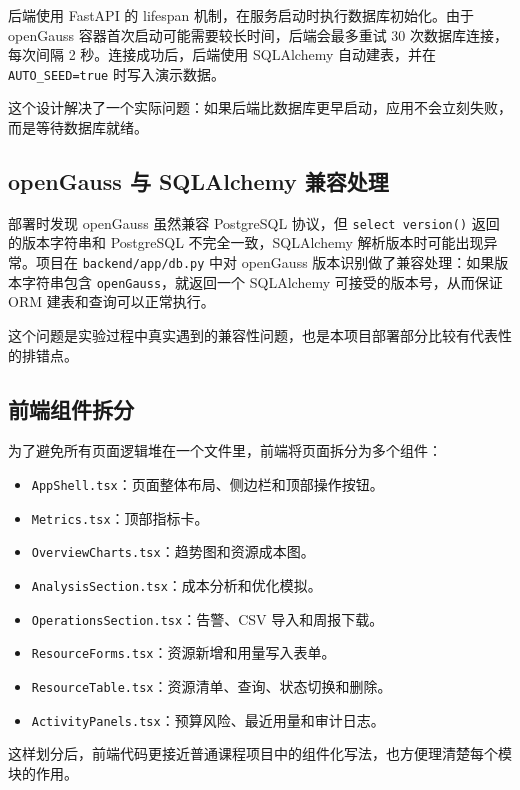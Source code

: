 后端使用 FastAPI 的 lifespan 机制，在服务启动时执行数据库初始化。由于
openGauss 容器首次启动可能需要较长时间，后端会最多重试 30
次数据库连接，每次间隔 2 秒。连接成功后，后端使用 SQLAlchemy
自动建表，并在 \texttt{AUTO\_SEED=true} 时写入演示数据。

这个设计解决了一个实际问题：如果后端比数据库更早启动，应用不会立刻失败，而是等待数据库就绪。

\subsection{openGauss 与 SQLAlchemy
兼容处理}\label{opengauss-ux4e0e-sqlalchemy-ux517cux5bb9ux5904ux7406}

部署时发现 openGauss 虽然兼容 PostgreSQL 协议，但
\texttt{select\ version()} 返回的版本字符串和 PostgreSQL
不完全一致，SQLAlchemy 解析版本时可能出现异常。项目在
\texttt{backend/app/db.py} 中对 openGauss
版本识别做了兼容处理：如果版本字符串包含 \texttt{openGauss}，就返回一个
SQLAlchemy 可接受的版本号，从而保证 ORM 建表和查询可以正常执行。

这个问题是实验过程中真实遇到的兼容性问题，也是本项目部署部分比较有代表性的排错点。

\subsection{前端组件拆分}\label{ux524dux7aefux7ec4ux4ef6ux62c6ux5206}

为了避免所有页面逻辑堆在一个文件里，前端将页面拆分为多个组件：

\begin{itemize}
\tightlist
\item
  \texttt{AppShell.tsx}：页面整体布局、侧边栏和顶部操作按钮。
\item
  \texttt{Metrics.tsx}：顶部指标卡。
\item
  \texttt{OverviewCharts.tsx}：趋势图和资源成本图。
\item
  \texttt{AnalysisSection.tsx}：成本分析和优化模拟。
\item
  \texttt{OperationsSection.tsx}：告警、CSV 导入和周报下载。
\item
  \texttt{ResourceForms.tsx}：资源新增和用量写入表单。
\item
  \texttt{ResourceTable.tsx}：资源清单、查询、状态切换和删除。
\item
  \texttt{ActivityPanels.tsx}：预算风险、最近用量和审计日志。
\end{itemize}

这样划分后，前端代码更接近普通课程项目中的组件化写法，也方便理清楚每个模块的作用。

